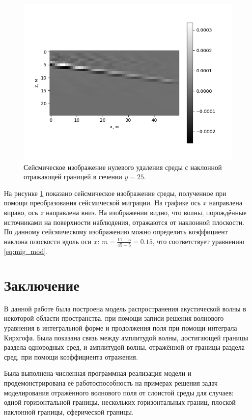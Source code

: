 \documentclass[a4paper, fontsize=14pt]{article}
\begin{document}
	
	\begin{figure}[H]
		\centering
		\includegraphics[width=.9\textwidth]{mig_tilted_central_ok.png}
		\caption{Сейсмическое изображение нулевого удаления среды с наклонной отражающей границей в сечении $y=25$.}
		\label{fig:mig_tilt}
	\end{figure}
	На рисунке \ref{fig:mig_tilt} показано сейсмическое изображение среды, полученное при помощи преобразования сейсмической миграции. 
	На графике ось $x$ направлена вправо, ось $z$ направлена вниз. На изображении видно, что волны, порождённые источниками на поверхности наблюдения, отражаются от наклонной плоскости.  По данному сейсмическому изображению можно определить коэффициент наклона плоскости вдоль оси $x$: $m = \frac{11-5}{45-5} = 0.15$, что соответствует уравнению \eqref{eq:mig_mod}. 
	
	
	\clearpage
	
	
	\section*{Заключение} 
	В данной работе была построена модель распространения  акустической волны в некоторой области
	 пространства, при помощи записи решения волнового уравнения в интегральной форме и продолжения поля при
	 помощи интеграла Кирхгофа. Была показана связь между амплитудой волны, достигающей границы раздела
	  однородных сред, и амплитудой волны, отражённой от границы раздела сред, при помощи коэффициента
	  отражения.
	
	Была выполнена численная программная реализация модели и продемонстрирована её работоспособность на примерах решения задач моделирования отражённого волнового поля от слоистой среды для случаев: одной горизонтальной границы, нескольких горизонтальных границ, плоской наклонной границы, сферической границы.
	
\end{document}

